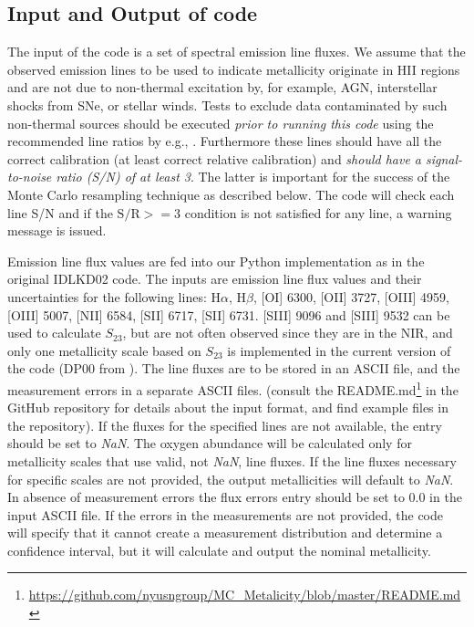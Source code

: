 \documentclass{emulateapj}
\newcommand{\ha}{H$\alpha$}
\newcommand{\hb}{H$\beta$}
\begin{document}
\subsection{Input and Output of code}\label{sec:IO}

The input of the code is a set of spectral emission line fluxes. We assume that the observed emission lines to be used to indicate metallicity originate in HII regions and are not due to non-thermal excitation by, for example, AGN, interstellar shocks from SNe, or stellar winds.  Tests to exclude data contaminated by such non-thermal sources should be executed \emph{prior to running this code} using the recommended line ratios by e.g., \citealt{baldwin81,kauffmann03,kewley06_sdss}. Furthermore these lines should have all the correct calibration (at least correct relative calibration) and \emph{should have a signal-to-noise ratio (S/N) of at least 3}. The latter is important for the success of the Monte Carlo resampling technique as described below. The code will check each line S/N and if the $\mathrm{S/R} >= 3$ condition is not satisfied for any line, a warning message is issued.

Emission line flux values are fed into our Python implementation as in the original IDLKD02 code. The inputs are emission line flux values and their uncertainties for the following lines: \ha, \hb, [OI] 6300, [OII] 3727, [OIII] 4959, [OIII] 5007, [NII] 6584, [SII] 6717, [SII] 6731.  [SIII] 9096 and [SIII] 9532 can be used to calculate $S_{23}$, but are not often observed since they are in the NIR, and only one metallicity scale  based on $S_{23}$ is implemented in the current version of the code (DP00 from \citealt{diaz00}). The line fluxes are to be stored in an ASCII file, and the measurement errors in a separate ASCII files.
(consult the README.md\footnote{\url{https://github.com/nyusngroup/MC_Metalicity/blob/master/README.md}} in the GitHub repository for details about the input format, and find example files in the repository). 
 If the fluxes for the specified lines are not available, the entry should be set to \emph{NaN}. The oxygen abundance will be calculated only for metallicity scales that use valid, not \emph{NaN}, line fluxes. 
If the line fluxes necessary for specific scales are not provided, the output metallicities will default to \emph{NaN}. In absence of measurement errors the flux errors entry should be set to 0.0 in the input ASCII file. If the errors in the measurements are not provided, the code will specify that it cannot create a measurement distribution and determine a confidence interval, but it will calculate and output the nominal metallicity.
\end{document}
